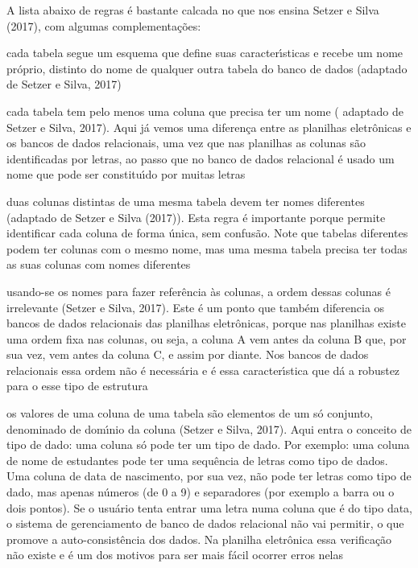 \documentclass[
12pt,		%
openright,	%
twoside,  %
a4paper,			%
chapter=TITLE,		%
english,			%
french,				%
spanish,			%
brazil				%
]{USPSC-classe/USPSC}
\begin{document}
A lista abaixo de regras \'e bastante calcada no que nos ensina  Setzer e Silva (2017), com algumas complementa\c{c}\~oes:









\begin{alineas}
\item cada tabela segue um esquema que define suas caracter\'{\i}sticas e recebe um nome pr\'oprio, distinto do nome de qualquer outra tabela do banco de dados (adaptado de Setzer e Silva, 2017)
\item cada tabela tem pelo menos uma coluna que precisa ter um nome ( adaptado de Setzer e Silva, 2017). Aqui j\'a vemos uma diferen\c{c}a entre as planilhas eletr\^onicas e os bancos de dados relacionais, uma vez que nas planilhas as colunas s\~ao identificadas por letras, ao passo que no banco de dados relacional \'e usado um nome que pode ser constitu\'{\i}do por muitas letras
\item duas colunas distintas de uma mesma tabela devem ter nomes diferentes (adaptado de Setzer e Silva (2017)). Esta regra \'e importante porque permite identificar cada coluna de forma \'unica, sem confus\~ao. Note que tabelas diferentes podem ter colunas com o mesmo nome, mas uma mesma tabela precisa ter todas as suas colunas com nomes diferentes
\item usando-se os nomes para fazer refer\^encia \`as colunas, a ordem dessas colunas \'e irrelevante  (Setzer e Silva, 2017). Este \'e um ponto que tamb\'em diferencia os bancos de dados relacionais das planilhas eletr\^onicas, porque nas planilhas existe uma ordem fixa nas colunas, ou seja, a coluna A vem antes da coluna B que, por sua vez, vem antes da coluna C, e assim por diante. Nos bancos de dados relacionais essa ordem n\~ao \'e necess\'aria e \'e essa caracter\'{\i}stica que d\'a a robustez para o esse tipo de estrutura
\item os valores de uma coluna de uma tabela s\~ao elementos de um s\'o conjunto, denominado de dom\'{\i}nio da coluna  (Setzer e Silva, 2017). Aqui entra o conceito de tipo de dado: uma coluna s\'o pode ter um tipo de dado. Por exemplo: uma coluna de nome de estudantes pode ter uma sequ\^encia de letras como tipo de dados. Uma coluna de data de nascimento, por sua vez, n\~ao pode ter letras como tipo de dado, mas apenas n\'umeros (de 0 a 9) e separadores (por exemplo a barra ou o dois pontos). Se o usu\'ario tenta entrar uma letra numa coluna que \'e do tipo data, o sistema de gerenciamento de banco de dados relacional n\~ao vai permitir, o que promove a auto-consist\^encia dos dados. Na planilha eletr\^onica essa verifica\c{c}\~ao n\~ao existe e \'e um dos motivos para ser mais f\'acil ocorrer erros nelas

\end{alineas}
\end{document}
